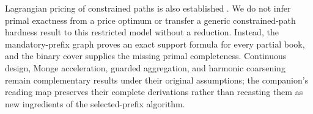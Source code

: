 Lagrangian pricing of constrained paths is also established \citep{HandlerZang1980}. We do not infer primal exactness from a price optimum or transfer a generic constrained-path hardness result to this restricted model without a reduction. Instead, the mandatory-prefix graph proves an exact support formula for every partial book, and the binary cover supplies the missing primal completeness. Continuous design, Monge acceleration, guarded aggregation, and harmonic coarsening remain complementary results under their original assumptions; the companion's reading map preserves their complete derivations rather than recasting them as new ingredients of the selected-prefix algorithm.
